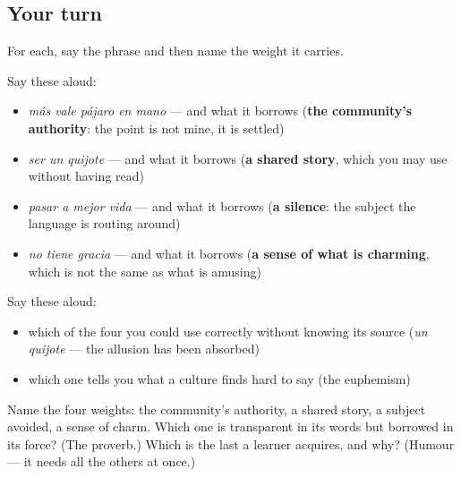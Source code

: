 \subsection*{Your turn}
For each, say the phrase and then name the weight it carries.

Say these aloud:

\begin{itemize}
\raggedright
  \item \emph{más vale pájaro en mano} — and what it borrows (\textbf{the community's authority}: the point is not mine, it is settled)
  \item \emph{ser un quijote} — and what it borrows (\textbf{a shared story}, which you may use without having read)
  \item \emph{pasar a mejor vida} — and what it borrows (\textbf{a silence}: the subject the language is routing around)
  \item \emph{no tiene gracia} — and what it borrows (\textbf{a sense of what is charming}, which is not the same as what is amusing)
\end{itemize}

Say these aloud:

\begin{itemize}
\raggedright
  \item which of the four you could use correctly without knowing its source (\emph{un quijote} — the allusion has been absorbed)
  \item which one tells you what a culture finds hard to say (the euphemism)
\end{itemize}

\begin{tcolorbox}[breakable,colback=teal!4,colframe=teal!35!black,title={Before you move on}]
Name the four weights: the community's authority, a shared story, a subject avoided, a sense of charm. Which one is transparent in its words but borrowed in its force? (The proverb.) Which is the last a learner acquires, and why? (Humour — it needs all the others at once.)
\end{tcolorbox}
